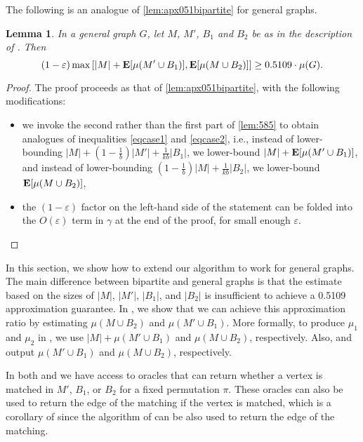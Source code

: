 \documentclass[letterpaper,11pt]{article}
\renewcommand{\epsilon}{\varepsilon}
\DeclareMathOperator{\E}{\ensuremath{\normalfont \textbf{E}}}
\newtheorem{lemma}{Lemma}[section]
\begin{document}
The following is an analogue of \cref{lem:apx051bipartite} for general graphs.
\begin{lemma} \label{lem:apx051general}
    In a general graph $G$,
    let $M$, $M'$, $B_1$ and $B_2$ be as in the description of . Then
    \[(1-\epsilon)\max \left[|M| + \E[\mu(M' \cup B_1)], \E[\mu(M \cup B_2)] \right] \geq 0.5109  \cdot\mu(G) .\]
\end{lemma}
\begin{proof}
    The proof proceeds as that of \cref{lem:apx051bipartite}, with the following modifications:
    \begin{itemize}
        \item we invoke the second rather than the first part of \cref{lem:585} to obtain analogues of inequalities \eqref{eqcase1} and \eqref{eqcase2},
        i.e., instead of lower-bounding $|M| + (1 - \frac{1}{b}) |M'| + \frac{1}{kb} |B_1|$, we lower-bound $|M| + \E[\mu(M' \cup B_1)]$,
        and instead of lower-bounding
        $(1 - \frac{1}{b}) |M| + \frac{1}{kb} |B_2|$,
        we lower-bound $\E[\mu(M \cup B_2)]$,
        \item the $(1-\epsilon)$ factor on the left-hand side of the statement can be folded into the $O(\epsilon)$ term in $\gamma$ at the end of the proof, for small enough $\epsilon$.
    \end{itemize}
\end{proof}

In this section, we show how to extend our algorithm to work for general graphs. The main difference between bipartite and general graphs is that the estimate based on the sizes of $|M|$, $|M'|$, $|B_1|$, and $|B_2|$ is insufficient to achieve a 0.5109 approximation guarantee. In , we show that we can achieve this approximation ratio by estimating $\mu(M \cup B_2)$ and $\mu(M' \cup B_1)$. More formally, to produce $\mu_1$ and $\mu_2$ in , we use $|M| + \mu(M' \cup B_1)$ and $\mu(M \cup B_2)$, respectively. Also,  and  output $\mu(M' \cup B_1)$ and $\mu(M \cup B_2)$, respectively.

In both  and  we have access to oracles that can return whether a vertex is matched in $M'$, $B_1$, or $B_2$ for a fixed permutation $\pi$. These oracles can also be used to return the edge of the matching if the vertex is matched, which is a corollary of  since the algorithm of  can be also used to return the edge of the matching.
\end{document}
